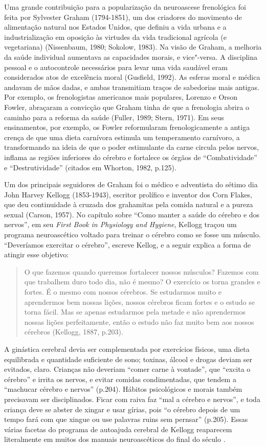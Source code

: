 Uma grande contribuição para a popularização da neuroascese frenológica
foi feita por Sylvester Graham (1794-1851), um dos criadores do
movimento de alimentação natural nos Estados Unidos, que definiu a vida
urbana e a industrialização em oposição às virtudes da vida tradicional
agrícola (e vegetariana) (Nissenbaum, 1980; Sokolow, 1983). Na visão de
Graham, a melhoria da saúde individual aumentava as capacidades morais,
e vice"-versa. A disciplina pessoal e o autocontrole necessários para
levar uma vida saudável eram considerados atos de excelência moral
(Gusfield, 1992). As esferas moral e médica andavam de mãos dadas, e
ambas transmitiam traços de sabedorias mais antigas. Por exemplo, os
frenologistas americanos mais populares, Lorenzo e Orson Fowler,
abraçaram a convicção que Graham tinha de que a frenologia abrira o
caminho para a reforma da saúde (Fuller, 1989; Stern, 1971). Em seus
ensinamentos, por exemplo, os Fowler reformularam frenologicamente a
antiga crença de que uma dieta carnívora estimula um temperamento
carnívoro, a transformando na ideia de que o poder estimulante da carne
circula pelos nervos, inflama as regiões inferiores do cérebro e
fortalece os órgãos de ``Combatividade'' e ``Destrutividade'' (citados
em Whorton, 1982, p.125).

Um dos principais seguidores de Graham foi o médico e adventista do
sétimo dia John Harvey Kellogg (1853-1943), escritor prolífico e
inventor dos Corn Flakes, que deu continuidade à cruzada dos grahamitas
pela comida natural e a pureza sexual (Carson, 1957). No capítulo sobre
``Como manter a saúde do cérebro e dos nervos'', em seu \emph{First Book
in Physiology and Hygiene}, Kellogg traçou um programa neuroascético
voltado para treinar o cérebro como se fosse um músculo. ``Deveríamos
exercitar o cérebro'', escreve Kellog, e a seguir explica a forma de
atingir esse objetivo:

\begin{quote}
O que fazemos quando queremos fortalecer nossos músculos? Fazemos com
que trabalhem duro todo dia, não é mesmo? O exercício os torna grandes e
fortes. É o mesmo com nossos cérebros. Se estudarmos muito e aprendermos
bem nossas lições, nossos cérebros ficam fortes e o estudo se torna
fácil. Mas se apenas estudarmos pela metade e não aprendermos nossas
lições perfeitamente, então o estudo não faz muito bem aos nossos
cérebros (Kellogg, 1887, p.203).
\end{quote}

A ginástica cerebral devia ser complementada por exercícios físicos, uma
dieta equilibrada e quantidade suficiente de sono; toxinas, álcool e
drogas deviam ser evitados, claro. Crianças não deveriam ``comer carne à
vontade'', que ``excita o cérebro'' e irrita os nervos, e evitar comidas
condimentadas, que tendem a ``machucar cérebro e nervos'' (p.204).
Hábitos psicológicos e morais também precisavam ser disciplinados. Ficar
com raiva faz ``mal a cérebro e nervos'', e toda criança deve se abster
de xingar e usar gírias, pois ``o cérebro depois de um tempo fará com
que xingue ou use palavras ruins sem pernsar'' (p.205). Essas várias
facetas do programa de autoajuda cerebral de Kellogg reaparecem
literalmente em muitos dos manuais neuroascéticos do final do século .

